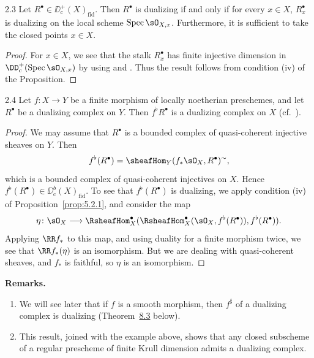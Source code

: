 \begin{bookcorollary}{2.3}\label{cor:5.2.3}
Let $R^\bullet\in\DD_{\mathrm{c}}^+(X)_{\mathrm{fid}}$. Then $R^\bullet$ is dualizing if and only if for every $x\in X$, $R_x^\bullet$ is dualizing on the local scheme $\operatorname{Spec}\sO_{X,x}$. Furthermore, it is sufficient to take the closed points $x\in X$.
\end{bookcorollary}

\begin{proof}
For $x\in X$, we see that the stalk $R_x^\bullet$ has finite injective dimension in $\DD^+_{\mathrm{c}}(\operatorname{Spec}\sO_{X,x})$ by using  and . Thus the result follows from condition (iv) of the Proposition.
\end{proof}

\begin{bookproposition}{2.4}\label{prop:5.2.4}
Let $f\colon X\to Y$ be a finite morphism of locally noetherian preschemes, and let $R^\bullet$ be a dualizing complex on $Y$. Then $f^{\flat}R^\bullet$ is a dualizing complex on $X$ (cf.\ ).
\end{bookproposition}

\begin{proof}
We may assume that $R^\bullet$ is a bounded complex of quasi-coherent injective sheaves on $Y$. Then
\[
f^{\flat}(R^{\bullet}) = \sheafHom_{Y}(f_{*}\sO_{X},R^{\bullet})^{\sim},
\]
which is a bounded complex of quasi-coherent injectives on $X$. Hence $f^{\flat}(R^{\bullet})\in\DD^{b}_{\mathrm{c}}(X)_{\mathrm{fid}}$. To see that $f^{\flat}(R^{\bullet})$ is dualizing, we apply condition (iv) of Proposition~\ref{prop:5.2.1}, and consider the map
\[
\eta\colon \sO_{X}\longrightarrow \RsheafHom_{X}^{\bullet}(\RsheafHom_{X}^{\bullet}(\sO_{X}, f^{\flat}(R^{\bullet})), f^{\flat}(R^{\bullet})).
\]
Applying $\RR f_*$ to this map, and using duality for a finite morphism  twice, we see that $\RR f_*(\eta)$ is an isomorphism. But we are dealing with quasi-coherent sheaves, and $f_*$ is faithful, so $\eta$ is an isomorphism.
\end{proof}

\par\medskip\noindent\textbf{Remarks.}
\begin{enumerate}
\item We will see later that if $f$ is a smooth morphism, then $f^{\sharp}$ of a dualizing complex is dualizing (Theorem~\hyperref[thm:5.8.3]{8.3} below).
\item This result, joined with the example above, shows that any closed subscheme of a regular prescheme of finite Krull dimension admits a dualizing complex.
\end{enumerate}
\par\medskip

